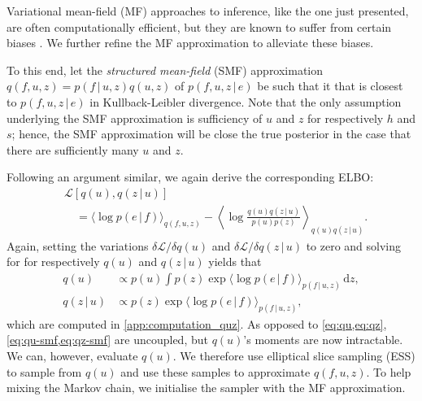 \documentclass{article}
\newcommand{\id}[1]{\, \mathrm{d} #1}     %
\newcommand{\cond}{\, | \,}               %
\renewcommand{\ll}{\left}
\newcommand{\rr}{\right}
\newcommand{\la}{\langle}
\newcommand{\ra}{\rangle}
\begin{document}
Variational mean-field (MF) approaches to inference, like the one just presented, are often computationally efficient, but they are known to suffer from certain biases \cite{MacKay:2002:Information_Theory_Learning,Turner:2011:Two_Problems_With_Variational_Expectation,Murphy:2012:Probabilistic_Perspective}. We further refine the MF approximation to alleviate these biases.

To this end, let the \textit{structured mean-field} (SMF) approximation $q(f,u,z)=p(f\cond u, z)q(u,z)$ of $p(f,u,z\cond e)$ be such that it that is closest to $p(f,u,z\cond e)$ in Kullback-Leibler divergence. Note that the only assumption underlying the SMF approximation is sufficiency of $u$ and $z$ for respectively $h$ and $s$; hence, the SMF approximation will be close the true posterior in the case that there are sufficiently many $u$ and $z$.

Following an argument similar, we again derive the corresponding ELBO:
\begin{align*}
    &\mathcal{L}[q(u),q(z\cond u)] \\
    &\quad= \la \log p(e\cond f) \ra_{q(f,u,z)}- \ll\la\log\frac{q(u)q(z\cond u)}{p(u)p(z)}\rr\ra_{q(u)q(z\cond u)}.
\end{align*}
Again, setting the variations $\delta \mathcal{L} / \delta q(u)$ and $\delta \mathcal{L} / \delta q(z\cond u)$ to zero and solving for for respectively $q(u)$ and $q(z\cond u)$ yields that
\begin{align}
    q(u) &\propto p(u) \int p(z) \exp\la\log p(e\cond f)\ra_{p(f\cond u, z)}\id{z}, \label{eq:qu-smf} \\
    q(z\cond u) &\propto p(z)\exp\la \log p(e\cond f)\ra_{p(f\cond u, z)}, \label{eq:qz-smf}
\end{align}
which are computed in \cref{app:computation_quz}.
As opposed to \cref{eq:qu,eq:qz}, \cref{eq:qu-smf,eq:qz-smf} are uncoupled, but $q(u)$'s moments are now intractable. We can, however, evaluate $q(u)$. We therefore use elliptical slice sampling (ESS) \cite{Murray:2010:Elliptical_Slice_Sampling} to sample from $q(u)$ and use these samples to approximate $q(f, u, z)$. To help mixing the Markov chain, we initialise the sampler with the MF approximation.
\end{document}
